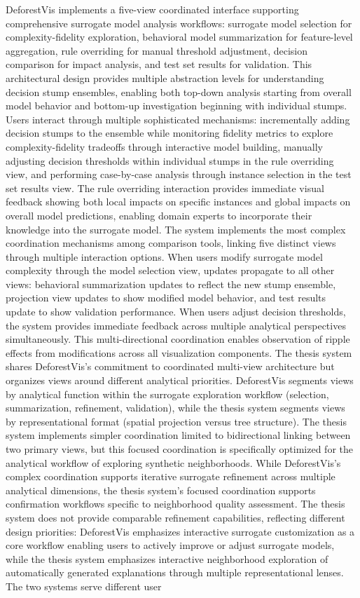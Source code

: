 DeforestVis \cite{Chatzimparmpas2023DeforestVisBA} implements a five-view coordinated interface supporting comprehensive surrogate model analysis workflows: surrogate model selection for complexity-fidelity exploration, behavioral model summarization for feature-level aggregation, rule overriding for manual threshold adjustment, decision comparison for impact analysis, and test set results for validation. This architectural design provides multiple abstraction levels for understanding decision stump ensembles, enabling both top-down analysis starting from overall model behavior and bottom-up investigation beginning with individual stumps. Users interact through multiple sophisticated mechanisms: incrementally adding decision stumps to the ensemble while monitoring fidelity metrics to explore complexity-fidelity tradeoffs through interactive model building, manually adjusting decision thresholds within individual stumps in the rule overriding view, and performing case-by-case analysis through instance selection in the test set results view. The rule overriding interaction provides immediate visual feedback showing both local impacts on specific instances and global impacts on overall model predictions, enabling domain experts to incorporate their knowledge into the surrogate model. The system implements the most complex coordination mechanisms among comparison tools, linking five distinct views through multiple interaction options. When users modify surrogate model complexity through the model selection view, updates propagate to all other views: behavioral summarization updates to reflect the new stump ensemble, projection view updates to show modified model behavior, and test results update to show validation performance. When users adjust decision thresholds, the system provides immediate feedback across multiple analytical perspectives simultaneously. This multi-directional coordination enables observation of ripple effects from modifications across all visualization components. The thesis system shares DeforestVis's commitment to coordinated multi-view architecture but organizes views around different analytical priorities. DeforestVis segments views by analytical function within the surrogate exploration workflow (selection, summarization, refinement, validation), while the thesis system segments views by representational format (spatial projection versus tree structure). The thesis system implements simpler coordination limited to bidirectional linking between two primary views, but this focused coordination is specifically optimized for the analytical workflow of exploring synthetic neighborhoods. While DeforestVis's complex coordination supports iterative surrogate refinement across multiple analytical dimensions, the thesis system's focused coordination supports confirmation workflows specific to neighborhood quality assessment. The thesis system does not provide comparable refinement capabilities, reflecting different design priorities: DeforestVis emphasizes interactive surrogate customization as a core workflow enabling users to actively improve or adjust surrogate models, while the thesis system emphasizes interactive neighborhood exploration of automatically generated explanations through multiple representational lenses. The two systems serve different user 